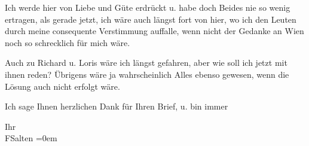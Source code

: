 \pstart
           Ich werde hier von Liebe und {\pb}Güte erdrückt u. habe doch
               Beides nie so wenig ertragen, als gerade jetzt, ich wäre auch längst
               fort von hier, wo ich den Leuten durch meine consequente Verstimmung
               auffalle, wenn nicht der Gedanke an Wien noch so
               schrecklich für mich wäre.\pend
           
\pstart
           Auch zu Richard u. Loris wäre ich
               längst gefahren, aber wie soll ich jetzt mit ihnen reden? Übrigens wäre ja wahrscheinlich
               Alles ebenso gewesen, wenn die Lösung auch nicht erfolgt wäre.\pend
           
\pstart
           Ich sage Ihnen herzlichen Dank für Ihren Brief, u. {\pb}bin
               immer\pend
           
\pstart
           Ihr {\\[\baselineskip]}\spacefill\mbox{FSalten}\pend
           \leftskip=0em{}\endnumbering{}  \newcommand{\dateiname}{L03113}\newcommand{\titel}{Felix Salten an Arthur Schnitzler, 23. 8. 1892}\newcommand{\editorInnen}{Martin Anton Müller und Laura Untner}
